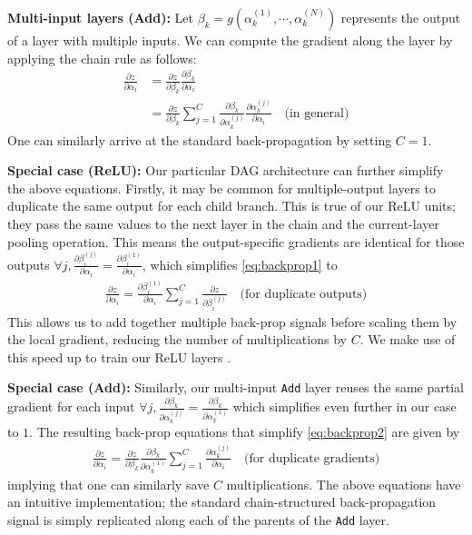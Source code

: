 \documentclass[10pt,twocolumn,letterpaper]{article}
\begin{document}
{\bf Multi-input layers (Add):} Let $\beta_k=g(\alpha^{(1)}_k,\cdots,\alpha^{(N)}_k)$ represents the output of a layer with multiple inputs. We can compute the gradient along the layer by applying the chain rule as follows:
\vspace{-5}
\begin{align}
\frac{\partial z}{\partial \alpha_i}&=\frac{\partial z}{\partial \beta_k}\frac{\partial \beta_k}{\partial \alpha_i} \nonumber \\
&=\frac{\partial z}{\partial \beta_k}\sum_{j=1}^{C}\frac{\partial \beta_k}{\partial \alpha_k^{(j)}}\frac{\partial \alpha_k^{(j)}}{\partial \alpha_i} \quad \text{(in general)} \label{eq:backprop2}
\end{align} 
One can similarly arrive at the standard back-propagation by setting $C=1$.


{\bf Special case (ReLU):} Our particular DAG architecture can further simplify the above equations. Firstly, it may be common for multiple-output layers to duplicate the same output for each child branch. This is true of our ReLU units; they pass the same values to the next layer in the chain and the current-layer pooling operation. This means the output-specific gradients are identical for those outputs $\forall j, \frac{\partial \beta_i^{(j)}}{\partial \alpha_i} =  \frac{\partial \beta_i^{(1)}}{\partial \alpha_i}$, which simplifies \eqref{eq:backprop1} to
\vspace{-5}
\begin{align}
\frac{\partial z}{\partial \alpha_i} = \frac{\partial \beta_i^{(1)}}{\partial \alpha_i} \sum_{j=1}^{C}\frac{\partial z}{\partial \beta_i^{(j)}} \quad \text{(for duplicate outputs)}
\end{align}
This allows us to add together multiple back-prop signals before scaling them by the local gradient, reducing 
the number of multiplications by $C$. We make use of this speed up to train our ReLU layers
. 

{\bf Special case (Add):} Similarly, our multi-input {\tt Add} layer reuses the same partial gradient for each input
$\forall j, \frac{\partial \beta_k}{\partial \alpha_k^{(j)}} = \frac{\partial \beta_k}{\partial \alpha_k^{(1)}}$ which simplifies even further in our case to $1$. The resulting back-prop equations that simplify \eqref{eq:backprop2} are given by
\vspace{-5}
\begin{align}
\frac{\partial z}{\partial \alpha_i} = \frac{\partial z}{\partial \beta_k} \frac{\partial \beta_k}{\partial \alpha_k^{(1)}}\sum_{j=1}^{C} \frac{\partial \alpha_k^{(j)}}{\partial \alpha_i}  \quad \text{(for duplicate gradients)}
\end{align}
\noindent implying that one can similarly save $C$ multiplications. The above equations have an intuitive implementation; the standard chain-structured back-propagation signal is simply replicated along each of the parents of the {\tt Add} layer.
\end{document}

